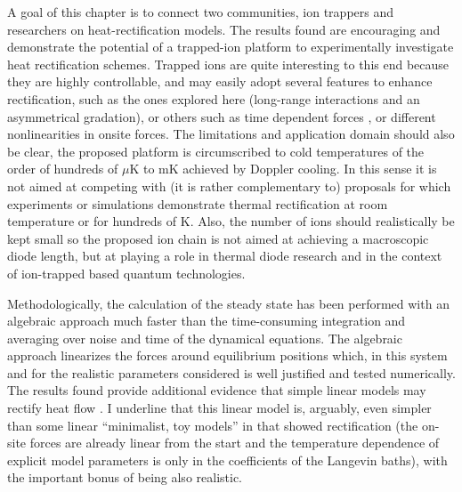 A goal of this chapter is to connect two communities, ion trappers and
researchers on heat-rectification models. The results found are encouraging and demonstrate the potential of a trapped-ion platform to experimentally investigate heat rectification schemes. Trapped ions are quite interesting to this end because  they are highly controllable,  and may easily adopt several features to enhance rectification, such as
the ones explored here (long-range interactions and an asymmetrical gradation),
or others such as time dependent forces \cite{Li2012,Riera-Campeny2018}, or different nonlinearities in onsite forces.
The limitations and application domain should also be clear,  the proposed platform is circumscribed to cold temperatures of the order of hundreds of $\mu$K to mK achieved by Doppler cooling.
In this sense it is not aimed at competing  with (it is rather complementary to)
proposals for which experiments  \cite{Chang2006,Leitner2013,Kobayashi2009,Elzouka2017} or simulations \cite{Zhang2015,Ma2018,Reid2019}
demonstrate thermal rectification
at room temperature or for hundreds of K.
Also, the number of ions should realistically be kept small so the proposed ion chain
is not aimed at achieving a macroscopic diode length, but at playing a role in thermal diode research
and in the context of ion-trapped based quantum technologies.

Methodologically, the calculation of the steady state has been performed with an algebraic approach much faster than
the time-consuming integration and averaging over noise and time of the dynamical equations.
The algebraic approach linearizes the forces around equilibrium positions which, in this system and for the realistic parameters considered  is well justified and tested numerically.
The results found provide additional evidence that simple linear models may  rectify heat flow \cite{Pereira2017}.  I  underline that this linear
model is, arguably,  even simpler than some linear ``minimalist, toy models'' in \cite{Pereira2017} that showed rectification (the on-site forces are already linear from the start and the temperature dependence of explicit model parameters is only in the coefficients of the Langevin baths), with the important bonus of being also realistic.
